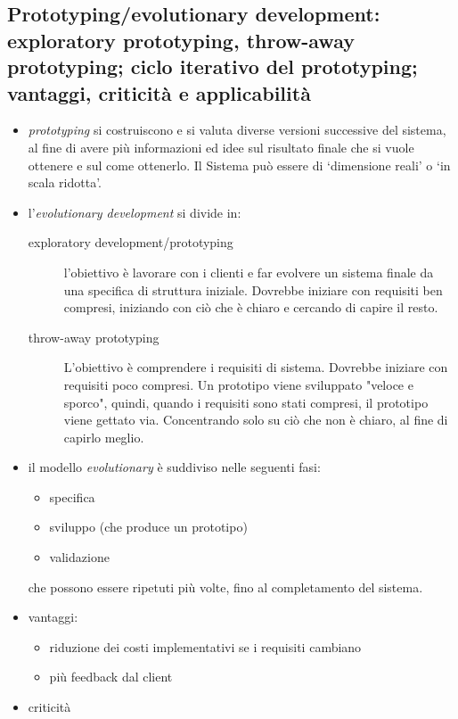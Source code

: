 \subsection{Prototyping/evolutionary development: exploratory prototyping, throw-away prototyping; ciclo iterativo del prototyping; vantaggi, criticità e applicabilità}
\begin{itemize}
    \item \textit{prototyping} si costruiscono e si valuta diverse versioni successive del sistema, al fine di avere più informazioni ed idee sul risultato finale che si vuole ottenere e sul come ottenerlo. Il Sistema può essere di ‘dimensione reali’ o ‘in scala ridotta’.
    \item l'\textit{evolutionary development} si divide in:
    \begin{description}
        \item[exploratory development/prototyping] l'obiettivo è lavorare con i clienti e far evolvere un sistema finale da una specifica di struttura iniziale. Dovrebbe iniziare con requisiti ben compresi, iniziando con ciò che è chiaro e cercando di capire il resto.
        \item[throw-away prototyping] L'obiettivo è comprendere i requisiti di sistema. Dovrebbe iniziare con requisiti poco compresi. Un prototipo viene sviluppato "veloce e sporco", quindi, quando i requisiti sono stati compresi, il prototipo viene gettato via. Concentrando solo su ciò che non è chiaro, al fine di capirlo meglio.
    \end{description}
    \item il modello \textit{evolutionary} è suddiviso nelle seguenti fasi:
    \begin{itemize}
        \item specifica
        \item sviluppo (che produce un prototipo)
        \item validazione
    \end{itemize}
    che possono essere ripetuti più volte, fino al completamento del sistema.
    \item vantaggi:
    \begin{itemize}
        \item riduzione dei costi implementativi se i requisiti cambiano
        \item più feedback dal client
    \end{itemize}
    \item criticità
    \begin{itemize}

\end{itemize}
\end{itemize}
